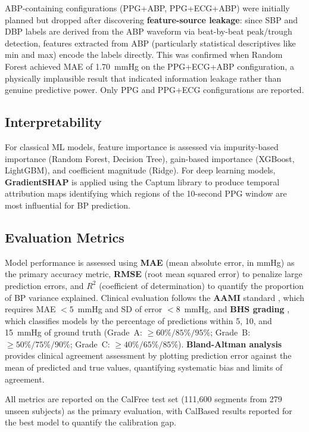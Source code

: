 \documentclass[11pt]{article}
\begin{document}
ABP-containing configurations (PPG+ABP, PPG+ECG+ABP) were initially planned but dropped after discovering \textbf{feature-source leakage}: since SBP and DBP labels are derived from the ABP waveform via beat-by-beat peak/trough detection, features extracted from ABP (particularly statistical descriptives like min and max) encode the labels directly. This was confirmed when Random Forest achieved MAE of 1.70~mmHg on the PPG+ECG+ABP configuration, a physically implausible result that indicated information leakage rather than genuine predictive power. Only PPG and PPG+ECG configurations are reported.

\subsection{Interpretability}

For classical ML models, feature importance is assessed via impurity-based importance (Random Forest, Decision Tree), gain-based importance (XGBoost, LightGBM), and coefficient magnitude (Ridge). For deep learning models, \textbf{GradientSHAP} \citep{lundberg2017shap} is applied using the Captum library \citep{kokhlikyan2020captum} to produce temporal attribution maps identifying which regions of the 10-second PPG window are most influential for BP prediction.

\subsection{Evaluation Metrics}

Model performance is assessed using \textbf{MAE} (mean absolute error, in mmHg) as the primary accuracy metric, \textbf{RMSE} (root mean squared error) to penalize large prediction errors, and \textbf{$R^2$} (coefficient of determination) to quantify the proportion of BP variance explained. Clinical evaluation follows the \textbf{AAMI} standard \citep{aami2003sp10}, which requires MAE $< 5$~mmHg and SD of error $< 8$~mmHg, and \textbf{BHS grading} \citep{obrien1993bhs}, which classifies models by the percentage of predictions within 5, 10, and 15~mmHg of ground truth (Grade~A: $\geq 60\%/85\%/95\%$; Grade~B: $\geq 50\%/75\%/90\%$; Grade~C: $\geq 40\%/65\%/85\%$). \textbf{Bland-Altman analysis} \citep{bland1986agreement} provides clinical agreement assessment by plotting prediction error against the mean of predicted and true values, quantifying systematic bias and limits of agreement.

All metrics are reported on the CalFree test set (111,600 segments from 279 unseen subjects) as the primary evaluation, with CalBased results reported for the best model to quantify the calibration gap.
\end{document}
